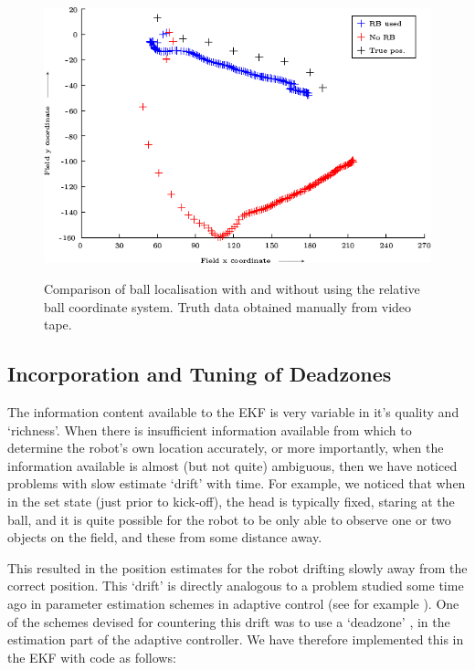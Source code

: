\begin{figure}[!h]
\begin{center}
    \scalebox{0.7} {\includegraphics{rickfigs/florian.png} }
\end{center}
\caption{Comparison of ball localisation with and without using the
relative ball coordinate system. Truth data obtained manually from
video tape.}
\label{Fig:RelativeBallTest}
\end{figure}


\subsection{Incorporation and Tuning of Deadzones}
\label{locwm:deadzone}
The information content available to the EKF is very variable in
it's quality and `richness'. When there is insufficient information
available from which to determine the robot's own location
accurately, or more importantly, when the information available is
almost (but not quite) ambiguous, then we have noticed problems with
slow estimate `drift' with time. For example, we noticed that when
in the set state (just prior to kick-off), the head is typically fixed, staring at the ball, and it is quite possible for the robot to be only able to observe one or two objects on the field, and these from some distance away.

This resulted in the position estimates for the robot drifting
slowly away from the correct position. This `drift' is directly
analogous to a problem studied some time ago in parameter estimation
schemes in adaptive control (see for example
\cite{PetersenNarendra1982}). One of the schemes devised for
countering this drift was to use a `deadzone'
\cite{PetersenNarendra1982}, \cite{Middleton1988} in the estimation
part of the adaptive controller. We have therefore implemented this
in the EKF with code as follows:

